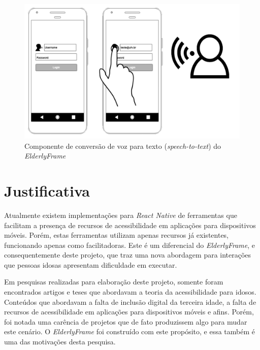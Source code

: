 \documentclass[
	12pt,				    %
	openright,			    %
	oneside,			    %
	a4paper,			    %
    sumario=tradicional,    %
	english,			    %
	brazil,				    %
	]{abntex2}              %
\begin{document}
\begin{figure}[H]
	\begin{center}
		\includegraphics[height=0.5\linewidth]{images/speech-to-text.png}
	\end{center}
	\caption[Componente \textit{SpeechToText} do \textit{ElderlyFrame}]{Componente de conversão de voz para texto (\textit{speech-to-text}) do \textit{ElderlyFrame}}
	\label{fig:speechToText}
\end{figure}

\chapter{Justificativa}\label{sec:justificativa}

Atualmente existem implementações para \textit{React Native} de ferramentas que facilitam a presença de recursos de acessibilidade em aplicações para dispositivos móveis. Porém, estas ferramentas utilizam apenas recursos já existentes, funcionando apenas como facilitadoras. Este é um diferencial do \textit{ElderlyFrame}, e consequentemente deste projeto, que traz uma nova abordagem para interações que pessoas idosas apresentam dificuldade em executar.

\par

Em pesquisas realizadas para elaboração deste projeto, somente foram encontrados artigos e teses que abordavam a teoria da acessibilidade para idosos. Conteúdos que abordavam a falta de inclusão digital da terceira idade,  a falta de recursos de acessibilidade em aplicações para dispositivos móveis e afins. Porém, foi notada uma carência de projetos que de fato produzissem algo para mudar este cenário. O \textit{ElderlyFrame} foi construído com este propósito, e essa também é uma das motivações desta pesquisa.
\end{document}
